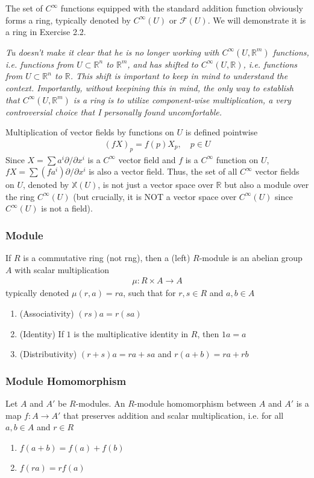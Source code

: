\documentclass{article}
\newcommand{\R}{\mathbb{R}}
\newcommand{\Cinfty}{C^{\infty}}
\begin{document}
	The set of $\Cinfty$ functions equipped with the standard addition function obviously forms a ring, typically denoted by $\Cinfty(U)$ or $\mathcal{F}(U)$. We will demonstrate it is a ring in Exercise 2.2.
	
	\textit{Tu doesn't make it clear that he is no longer working with $\Cinfty(U, \R^m)$ functions, i.e. functions from $U \subset \R^n$ to $\R^m$, and has shifted to $\Cinfty(U, \R)$, i.e. functions from $U \subset \R^n$ to $\R$. This shift is important to keep in mind to understand the context. Importantly, without keepining this in mind, the only way to establish that $\Cinfty(U, \R^m)$ is a ring is to utilize component-wise multiplication, a very controversial choice that I personally found uncomfortable.}
	
	Multiplication of vector fields by functions on $U$ is defined pointwise
	\begin{gather*}
		(fX)_p = f(p) X_p, \quad p \in U
	\end{gather*}
	Since $X = \sum a^i \partial / \partial x^i$ is a $\Cinfty$ vector field and $f$ is a $\Cinfty$ function on $U$, $fX = \sum (fa^i) \partial / \partial x^i$ is also a vector field. Thus, the set of all $\Cinfty$ vector fields on $U$, denoted by $\mathbb{X}(U)$, is not just a vector space over $\R$ but also a module over the ring $\Cinfty(U)$ (but crucially, it is NOT a vector space over $\Cinfty(U)$ since $\Cinfty(U)$ is not a field).
	
	\subsubsection*{Module}
	If $R$ is a commutative ring (not rng), then a (left) $R$-module is an abelian group $A$ with scalar multiplication
	\begin{gather*}
		\mu : R \times A \to A
	\end{gather*}
	typically denoted $\mu(r, a) = ra$, such that for $r, s \in R$ and $a, b \in A$
	\begin{enumerate}
		\item (Associativity) $(rs)a = r(sa)$
		\item (Identity) If $1$ is the multiplicative identity in $R$, then $1a = a$
		\item (Distributivity) $(r + s)a = ra + sa$ and $r(a + b) = ra + rb$
	\end{enumerate}
	
	\subsubsection*{Module Homomorphism}
	Let $A$ and $A'$ be $R$-modules. An $R$-module homomorphism between $A$ and $A'$ is a map $f : A \to A'$ that preserves addition and scalar multiplication, i.e. for all $a, b \in A$ and $r \in R$
	\begin{enumerate}
		\item $f(a + b) = f(a) + f(b)$
		\item $f(ra) = rf(a)$
	\end{enumerate}
	
\end{document}
